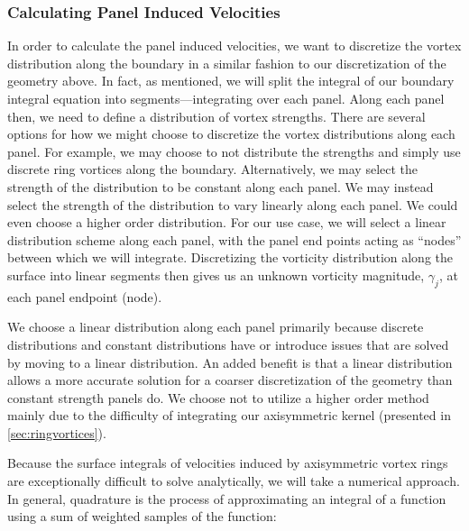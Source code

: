 \subsubsection{Calculating Panel Induced Velocities}


In order to calculate the panel induced velocities, we want to discretize the vortex distribution along the boundary in a similar fashion to our discretization of the geometry above.
%
In fact, as mentioned, we will split the integral of our boundary integral equation into segments---integrating over each panel.
%
Along each panel then, we need to define a distribution of vortex strengths.
%
There are several options for how we might choose to discretize the vortex distributions along each panel.
%
For example, we may choose to not distribute the strengths and simply use discrete ring vortices along the boundary.
%
Alternatively, we may select the strength of the distribution to be constant along each panel.
%
We may instead select the strength of the distribution to vary linearly along each panel.
%
We could even choose a higher order distribution.
%
For our use case, we will select a linear distribution scheme along each panel, with the panel end points acting as ``nodes'' between which we will integrate.
%
Discretizing the vorticity distribution along the surface into linear segments then gives us an unknown vorticity magnitude, \(\gamma_j\), at each panel endpoint (node).

We choose a linear distribution along each panel primarily because discrete distributions and constant distributions have or introduce issues that are solved by moving to a linear distribution.
%
An added benefit is that a linear distribution allows a more accurate solution for a coarser discretization of the geometry than constant strength panels do.
%
We choose not to utilize a higher order method mainly due to the difficulty of integrating our axisymmetric kernel (presented in \cref{sec:ringvortices}).

Because the surface integrals of velocities induced by axisymmetric vortex rings are exceptionally difficult to solve analytically, we will take a numerical approach.
%
In general, quadrature is the process of approximating an integral of a function using a sum of weighted samples of the function:

